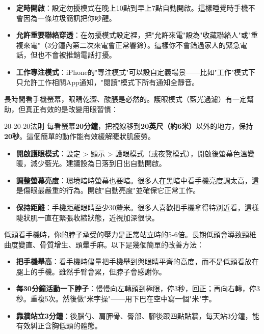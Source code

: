\begin{itemize}
  \item \textbf{定時開啟}：設定勿擾模式在晚上10點到早上7點自動開啟。這樣睡覺時手機不會因為一條垃圾簡訊把你吵醒。
  \item \textbf{允許重要聯絡穿透}：在勿擾模式設定裡，把"允許來電"設為"收藏聯絡人"或"重複來電"（3分鐘內第二次來電會正常響鈴）。這樣你不會錯過家人的緊急電話，但也不會被推銷電話打擾。
  \item \textbf{工作專注模式}：iPhone的"專注模式"可以設自定義場景——比如"工作"模式下只允許工作相關App通知，"閱讀"模式下所有通知全靜音。
\end{itemize}


長時間看手機螢幕，眼睛乾澀、酸脹是必然的。護眼模式（藍光過濾）有一定幫助，但真正有效的是改變用眼習慣：

\begin{tcbinfo}{20-20-20法則}
每看螢幕\textbf{20分鐘}，把視線移到\textbf{20英尺（約6米）}以外的地方，保持\textbf{20秒}。這個簡單的動作能有效緩解睫狀肌疲勞。

\end{tcbinfo}

\begin{itemize}
  \item \textbf{開啟護眼模式}：設定 > 顯示 > 護眼模式（或夜覽模式），開啟後螢幕色溫變暖，減少藍光。建議設為日落到日出自動開啟。
  \item \textbf{調整螢幕亮度}：環境暗時螢幕也要暗。很多人在黑暗中看手機亮度調太高，這是傷眼最嚴重的行為。開啟"自動亮度"並確保它正常工作。
  \item \textbf{保持距離}：手機距離眼睛至少30釐米。很多人喜歡把手機拿得特別近看，這樣睫狀肌一直在緊張收縮狀態，近視加深很快。
\end{itemize}


低頭看手機時，你的脖子承受的壓力是正常站立時的5-6倍。長期低頭會導致頸椎曲度變直、骨質增生、頭暈手麻。以下是幾個簡單的改善方法：

\begin{itemize}
  \item \textbf{把手機舉高}：看手機時儘量把手機舉到與眼睛平齊的高度，而不是低頭看放在腿上的手機。雖然手臂會累，但脖子會感謝你。
  \item \textbf{每30分鐘活動一下脖子}：慢慢向左轉頭到極限，停3秒，回正；再向右轉，停3秒。重複5次。然後做"米字操"——用下巴在空中寫一個"米"字。
  \item \textbf{靠牆站立3分鐘}：後腦勺、肩胛骨、臀部、腳後跟四點貼牆，每天站3分鐘，能有效糾正含胸低頭的體態。
\end{itemize}

